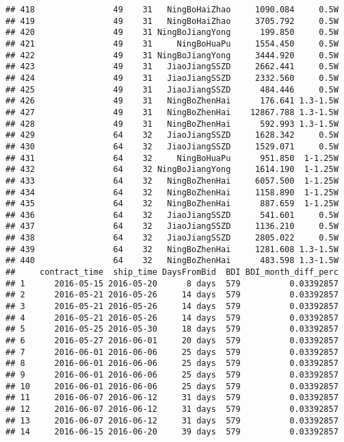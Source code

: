\documentclass[]{article}
\begin{document}
\begin{verbatim}
## 418                49    31   NingBoHaiZhao     1090.084     0.5W
## 419                49    31   NingBoHaiZhao     3705.792     0.5W
## 420                49    31 NingBoJiangYong      199.850     0.5W
## 421                49    31     NingBoHuaPu     1554.450     0.5W
## 422                49    31 NingBoJiangYong     3444.920     0.5W
## 423                49    31   JiaoJiangSSZD     2662.441     0.5W
## 424                49    31   JiaoJiangSSZD     2332.560     0.5W
## 425                49    31   JiaoJiangSSZD      484.446     0.5W
## 426                49    31   NingBoZhenHai      176.641 1.3-1.5W
## 427                49    31   NingBoZhenHai    12867.788 1.3-1.5W
## 428                49    31   NingBoZhenHai      592.993 1.3-1.5W
## 429                64    32   JiaoJiangSSZD     1628.342     0.5W
## 430                64    32   JiaoJiangSSZD     1529.071     0.5W
## 431                64    32     NingBoHuaPu      951.850  1-1.25W
## 432                64    32 NingBoJiangYong     1614.190  1-1.25W
## 433                64    32   NingBoZhenHai     6057.500  1-1.25W
## 434                64    32   NingBoZhenHai     1158.890  1-1.25W
## 435                64    32   NingBoZhenHai      887.659  1-1.25W
## 436                64    32   JiaoJiangSSZD      541.601     0.5W
## 437                64    32   JiaoJiangSSZD     1136.210     0.5W
## 438                64    32   JiaoJiangSSZD     2805.022     0.5W
## 439                64    32   NingBoZhenHai     1281.608 1.3-1.5W
## 440                64    32   NingBoZhenHai      483.598 1.3-1.5W
##     contract_time  ship_time DaysFromBid  BDI BDI_month_diff_perc
## 1      2016-05-15 2016-05-20      8 days  579          0.03392857
## 2      2016-05-21 2016-05-26     14 days  579          0.03392857
## 3      2016-05-21 2016-05-26     14 days  579          0.03392857
## 4      2016-05-21 2016-05-26     14 days  579          0.03392857
## 5      2016-05-25 2016-05-30     18 days  579          0.03392857
## 6      2016-05-27 2016-06-01     20 days  579          0.03392857
## 7      2016-06-01 2016-06-06     25 days  579          0.03392857
## 8      2016-06-01 2016-06-06     25 days  579          0.03392857
## 9      2016-06-01 2016-06-06     25 days  579          0.03392857
## 10     2016-06-01 2016-06-06     25 days  579          0.03392857
## 11     2016-06-07 2016-06-12     31 days  579          0.03392857
## 12     2016-06-07 2016-06-12     31 days  579          0.03392857
## 13     2016-06-07 2016-06-12     31 days  579          0.03392857
## 14     2016-06-15 2016-06-20     39 days  579          0.03392857

\end{verbatim}
\end{document}
